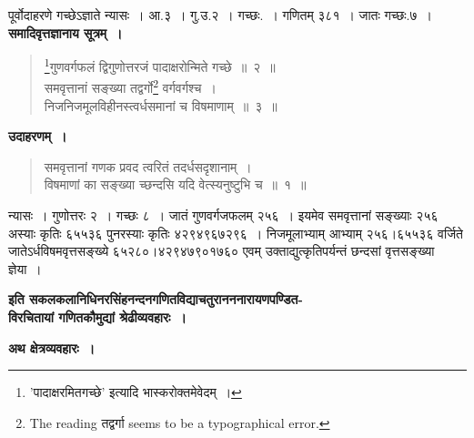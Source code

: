 \documentclass[11pt, openany]{book}
\makeatletter
\newcommand{\devanagarinumeral}[1]{%
	\devanagaridigits{\number\csname c@#1\endcsname}}
\makeatother
\begin{document}
 पूर्वोदाहरणे गच्छेऽज्ञाते न्यासः~। आ.\;३~। गु.\;उ.\;२~। 
गच्छः.~। गणितम् ३८१~। जातः गच्छः.\;७~। \\

\textbf{ समादिवृत्तज्ञानाय सूत्रम्~। }
\begin{quote}
    \bs 
    \footnote{'{\qt पादाक्षरमितगच्छे}' इत्यादि {\qt भास्करो}क्तमेवेदम्~। }गुणवर्गफलं द्विगुणोत्तरजं पादाक्षरोन्मिते गच्छे~॥~२~॥\\
समवृत्तानां सङ्ख्या तद्वर्गो\footnote{The reading तद्वर्गा seems to be a typographical error.} वर्गवर्गश्च~।\\
निजनिजमूलविहीनस्त्वर्धसमानां च विषमाणाम्~॥~३~॥

\end{quote}

\newpage
\pagestyle{fancy}
\fancyhead[C]{(~\thepage~)}
\renewcommand{\thepage}{\devanagarinumeral{page}}
\setcounter{page}{2}
\cfoot{}

\textbf{उदाहरणम्~। }
\begin{quote}
    \bqt 
    समवृत्तानां गणक प्रवद त्वरितं तदर्धसदृशानाम्~।\\
विषमाणां का सङ्ख्या च्छन्दसि यदि वेत्स्यनुष्टुभि च~॥~१~॥ 
\end{quote}

 न्यासः~। गुणोत्तरः २~। गच्छः ८~। जातं गुणवर्गजफलम्
२५६~। इयमेव समवृत्तानां सङ्ख्याः २५६ अस्याः कृतिः ६५५३६
पुनरस्याः कृतिः ४२९४९६७२९६~। निजमूलाभ्याम् आभ्याम् २५६।६५५३६ वर्जिते जातेऽर्धविषमवृत्तसङ्ख्ये ६५२८०।४२९४७९०१७६० 
एवम् उक्ताद्युत्कृतिपर्यन्तं छन्दसां वृत्तसङ्ख्या ज्ञेया~। 

\begin{center}
\textbf{इति सकलकलानिधिनरसिंहनन्दनगणितविद्याचतुरानननारायणपण्डित-\\
विरचितायां गणितकौमुद्यां श्रेढीव्यवहारः~।} \\
\vspace{8mm}

 \label{ch4}
{\Large \textbf{अथ क्षेत्रव्यवहारः~।} }
\end{center}
\end{document}
